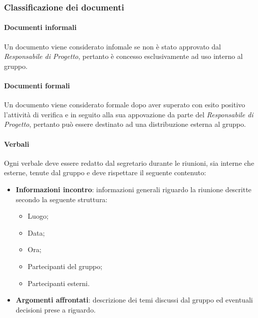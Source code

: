 \subsubsection{Classificazione dei documenti}
\paragraph{Documenti informali} \Spazio
Un documento viene considerato infomale se non è stato approvato dal \emph{Responsabile di Progetto}, pertanto è concesso esclusivamente ad uso interno al gruppo.

\paragraph{Documenti formali} \Spazio
Un documento viene considerato formale dopo aver superato con esito positivo l'attività di verifica e in seguito alla sua appovazione da parte del \emph{Responsabile di Progetto}, pertanto può essere destinato ad una distribuzione esterna al gruppo.

\paragraph{Verbali} \Spazio
Ogni verbale deve essere redatto dal segretario durante le riunioni, sia interne che esterne, tenute dal gruppo e deve rispettare il seguente contenuto:
\begin{itemize}
	\item \textbf{Informazioni incontro}: informazioni generali riguardo la riunione descritte secondo la seguente struttura:
	\begin{itemize}
		\item Luogo;
		\item Data;
		\item Ora;
		\item Partecipanti del gruppo;
		\item Partecipanti esterni.
	\end{itemize}
	\item \textbf{Argomenti affrontati}: descrizione dei temi discussi dal gruppo ed eventuali decisioni prese a riguardo.
\end{itemize}



